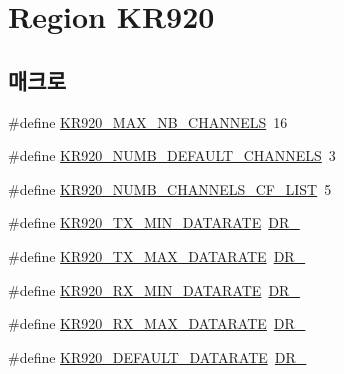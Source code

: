 \hypertarget{group___r_e_g_i_o_n_k_r920}{}\section{Region K\+R920}
\label{group___r_e_g_i_o_n_k_r920}
\subsection*{매크로}
\begin{DoxyCompactItemize}
\item 
\#define \mbox{\hyperlink{group___r_e_g_i_o_n_k_r920_ga28705c59a2c19a1de8b22d294fc6bebb}{K\+R920\+\_\+\+M\+A\+X\+\_\+\+N\+B\+\_\+\+C\+H\+A\+N\+N\+E\+LS}}~16
\item 
\#define \mbox{\hyperlink{group___r_e_g_i_o_n_k_r920_ga52b61aaab6dd3422f4c0e0551fd810fa}{K\+R920\+\_\+\+N\+U\+M\+B\+\_\+\+D\+E\+F\+A\+U\+L\+T\+\_\+\+C\+H\+A\+N\+N\+E\+LS}}~3
\item 
\#define \mbox{\hyperlink{group___r_e_g_i_o_n_k_r920_ga9184abc3c2682d4f7d9eee4d74bba21f}{K\+R920\+\_\+\+N\+U\+M\+B\+\_\+\+C\+H\+A\+N\+N\+E\+L\+S\+\_\+\+C\+F\+\_\+\+L\+I\+ST}}~5
\item 
\#define \mbox{\hyperlink{group___r_e_g_i_o_n_k_r920_ga9eff66e6e0242d6a7563dd346a56e3ab}{K\+R920\+\_\+\+T\+X\+\_\+\+M\+I\+N\+\_\+\+D\+A\+T\+A\+R\+A\+TE}}~\mbox{\hyperlink{group___r_e_g_i_o_n_ga6c4ef966b4f3d5eb7597b087f2b97095}{D\+R\+\_}}
\item 
\#define \mbox{\hyperlink{group___r_e_g_i_o_n_k_r920_ga58a4171632a233925b8b0153c66a6ff3}{K\+R920\+\_\+\+T\+X\+\_\+\+M\+A\+X\+\_\+\+D\+A\+T\+A\+R\+A\+TE}}~\mbox{\hyperlink{group___r_e_g_i_o_n_ga872e12c82020c02a7f70a1c6ed1375df}{D\+R\+\_}}
\item 
\#define \mbox{\hyperlink{group___r_e_g_i_o_n_k_r920_ga07e6cd760fe7f1fc3a572fdf20ceebb6}{K\+R920\+\_\+\+R\+X\+\_\+\+M\+I\+N\+\_\+\+D\+A\+T\+A\+R\+A\+TE}}~\mbox{\hyperlink{group___r_e_g_i_o_n_ga6c4ef966b4f3d5eb7597b087f2b97095}{D\+R\+\_}}
\item 
\#define \mbox{\hyperlink{group___r_e_g_i_o_n_k_r920_gae396329e09e498a769761010503fb797}{K\+R920\+\_\+\+R\+X\+\_\+\+M\+A\+X\+\_\+\+D\+A\+T\+A\+R\+A\+TE}}~\mbox{\hyperlink{group___r_e_g_i_o_n_ga872e12c82020c02a7f70a1c6ed1375df}{D\+R\+\_}}
\item 
\#define \mbox{\hyperlink{group___r_e_g_i_o_n_k_r920_ga574a2f448e5bde55946a05487bcc6de4}{K\+R920\+\_\+\+D\+E\+F\+A\+U\+L\+T\+\_\+\+D\+A\+T\+A\+R\+A\+TE}}~\mbox{\hyperlink{group___r_e_g_i_o_n_ga6c4ef966b4f3d5eb7597b087f2b97095}{D\+R\+\_}}

\end{DoxyCompactItemize}
